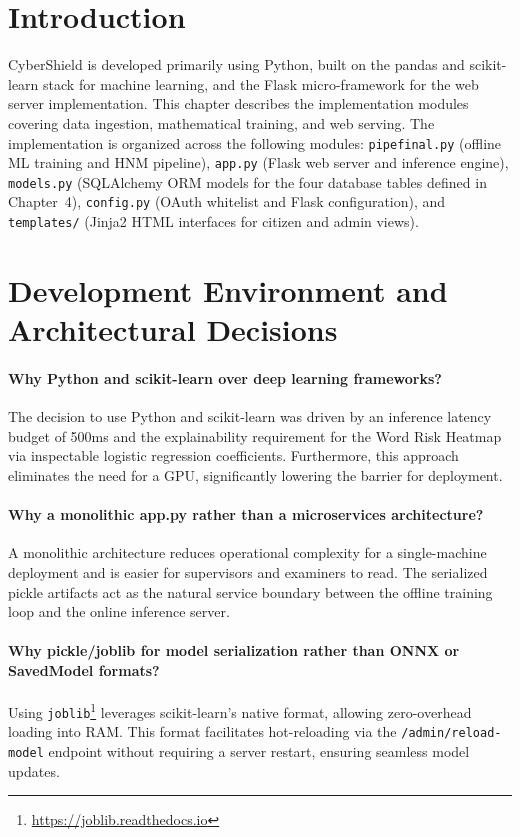 \section{Introduction}
CyberShield is developed primarily using Python, built on the pandas and scikit-learn stack for machine learning, and the Flask micro-framework for the web server implementation. This chapter describes the implementation modules covering data ingestion, mathematical training, and web serving. The implementation is organized across the following modules: \texttt{pipefinal.py} (offline ML training and HNM pipeline), \texttt{app.py} (Flask web server and inference engine), \texttt{models.py} (SQLAlchemy ORM models for the four database tables defined in Chapter~4), \texttt{config.py} (OAuth whitelist and Flask configuration), and \texttt{templates/} (Jinja2 HTML interfaces for citizen and admin views).

\section{Development Environment and Architectural Decisions}

\paragraph{Why Python and scikit-learn over deep learning frameworks?}
The decision to use Python and scikit-learn was driven by an inference latency budget of 500ms and the explainability requirement for the Word Risk Heatmap via inspectable logistic regression coefficients. Furthermore, this approach eliminates the need for a GPU, significantly lowering the barrier for deployment.

\paragraph{Why a monolithic app.py rather than a microservices architecture?}
A monolithic architecture reduces operational complexity for a single-machine deployment and is easier for supervisors and examiners to read. The serialized pickle artifacts act as the natural service boundary between the offline training loop and the online inference server.

\paragraph{Why pickle/joblib for model serialization rather than ONNX or SavedModel formats?}
Using \texttt{joblib}\footnote{\url{https://joblib.readthedocs.io}} leverages scikit-learn's native format, allowing zero-overhead loading into RAM. This format facilitates hot-reloading via the \texttt{/admin/reload-model} endpoint without requiring a server restart, ensuring seamless model updates.

